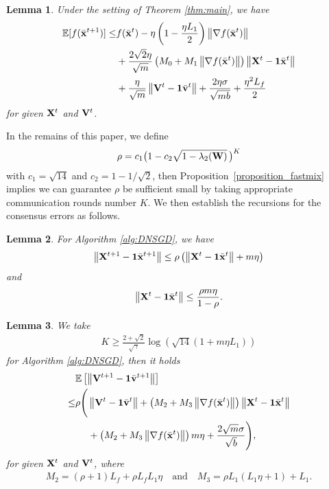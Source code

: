 \documentclass[sigconf]{acmart}
\newcommand{\Norm}[1]{\left\| #1 \right\|}
\def\vone{{\bf{1}}}
\def\vv{{\bf{v}}}
\def\vx{{\bf{x}}}
\def\BE{{\mathbb{E}}}
\def\mV {{\bf V}}
\def\mW {{\bf W}}
\def\mX {{\bf X}}
\theoremstyle{plain}
\newtheorem{lem}{Lemma}
\def\bx{{\bar\vx}}
\def\bv{{\bar\vv}}
\begin{document}
\begin{lem}\label{lem:descent-mean-2}
Under the setting of Theorem \ref{thm:main}, we have
\begin{align*}    
\BE[f(\bx^{t+1})]   
\leq & f(\bx^t) - \eta\left(1-\frac{\eta L_1}{2}\right)\Norm{\nabla f(\bx^t)} \\
& + \frac{2\sqrt{2}\eta}{\sqrt{m}}\left(M_0+M_1\Norm{\nabla f(\bx^t)}\right)\Norm{\mX^t-\vone\bx^t} \\
& + \frac{\eta}{\sqrt{m}}\Norm{\mV^t - \vone\bv^t} + \frac{2\eta\sigma}{\sqrt{mb}} + \frac{\eta^2L_f}{2}
\end{align*}
for given $\mX^t$ and $\mV^t$.
\end{lem}  

In the remains of this paper, we define 
\begin{align*}
\rho = c_1\big(1 - c_2\sqrt{1 - \lambda_2(\mW)}\,\big)^K    
\end{align*}
with $c_1=\sqrt{14}$ and $c_2=1-{1}/{\sqrt{2}}$, then
Proposition~\ref{proposition_fastmix} implies we can guarantee $\rho$ be sufficient small by taking appropriate communication rounds number $K$.
We then establish the recursions for the consensus errors as follows.

\begin{lem}\label{lem:recursion-X}
For Algorithm \ref{alg:DNSGD}, we have 
\begin{align*}
\Norm{\mX^{t+1}-\vone\bx^{t+1}} 
\leq \rho\left(\Norm{\mX^t - \vone\bx^t} + m\eta\right) 
\end{align*}
and
\begin{align*}
\Norm{\mX^t-\vone\bx^t} \leq \frac{\rho m\eta}{1-\rho}.
\end{align*}
\end{lem}


\begin{lem}\label{lem:recursion-V}
We take 
\begin{align*}
K\geq \frac{2+\sqrt{2}}{\sqrt{\gamma}}\log \left(\sqrt{14}(1+m \eta L_1)\right)    
\end{align*}
for Algorithm \ref{alg:DNSGD}, then it holds
\begin{align*}
   & \BE\left[\Norm{\mV^{t+1} - \vone\bv^{t+1}}\right] \\
\leq & \rho\Bigg(\Norm{\mV^t - \vone\bv^t} + \left(M_2 + M_3\Norm{\nabla f(\bx^{t})}\right)\Norm{\mX^t - \vone\bx^t} \\
& \quad~ + \left(M_2 + M_3\Norm{\nabla f(\bx^{t})}\right) m\eta + \frac{2\sqrt{m}\sigma}{\sqrt{b}}\Bigg),
\end{align*}
for given $\mX^t$ and $\mV^t$, 
where 
\begin{align*}
M_2 = (\rho+1)L_f+\rho L_fL_1\eta
\quad\text{and}\quad 
M_3 = \rho L_1(L_1\eta+1)+L_1.    
\end{align*}
\end{lem}
\end{document}
